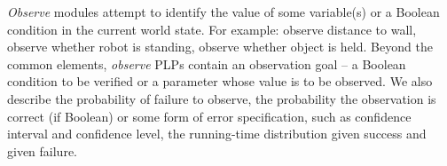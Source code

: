 \documentclass[ 5p, 12pt, times, twocolumn, sort&compress ]{elsarticle}
\begin{document}
%

{\em Observe\/} modules attempt to identify the value of some variable(s) or a Boolean condition in the current world state. For example:
observe distance to wall, observe whether robot is standing, observe whether object is held. 
Beyond the common elements, {\em observe} PLPs contain an observation goal -- a Boolean condition to be verified or a parameter whose value is to be observed.
We also describe the probability of failure to observe, the probability the observation is correct
(if Boolean) or some form of error specification, such as confidence interval and confidence level,
the running-time distribution given success and given failure.
\end{document}
